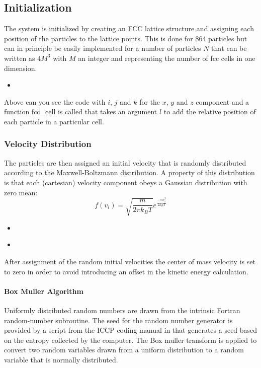 \documentclass[
10pt, %
a4paper, %
oneside, %
headinclude,footinclude, %
BCOR5mm, %
]{scrartcl}
\newcommand{\insertcode}[2]{\begin{itemize}\item[]\end{itemize}} %
\begin{document}
\subsection{Initialization}

The system is initialized by creating an FCC lattice structure and assigning each position of the particles to the lattice points. This is done for 864 particles but can in principle be easily implemented for a number of particles $N$ that can be written as $4M^3$ with $M$ an integer and representing the number of fcc cells in one dimension.

\insertcode{"Scripts/initialization_snippet_1.f90"}{Constructing the fcc lattice} %

Above can you see the code with $i$, $j$ and $k$ for the $x$, $y$ and $z$ component and a function fcc\_cell is called that takes an argument $l$ to add the relative position of each particle in a particular cell.


\subsubsection{Velocity Distribution}

The particles are then assigned an initial velocity that is randomly distributed according to the Maxwell-Boltzmann distribution. A property of this distribution is that each (cartesian) velocity component obeys a Gaussian distribution with zero mean:
\begin{equation} f(v_i) = \sqrt{\frac{m}{2\pi k_B T}} e^{\frac{-mv_i^2}{2k_BT}} \end{equation}

\insertcode{"Scripts/initialization_snippet_2.f90"}{Generating initial velocities} %

\insertcode{"Scripts/initialization_snippet_3.f90"}{Removing the center of mass degree of freedom} %

After assignment of the random initial velocities the center of mass velocity is set to zero in order to avoid introducing an offset in the kinetic energy calculation.

\paragraph{Box Muller Algorithm}
Uniformly distributed random numbers are drawn from the intrinsic Fortran random-number subroutine. The seed for the random number generator is provided by a script from the ICCP coding manual in \cite{Glosser:2015iccp} that generates a seed based on the entropy collected by the computer. The Box muller transform \cite{} is applied to convert two random variables drawn from a uniform distribution to a random variable that is normally distributed.
\end{document}
